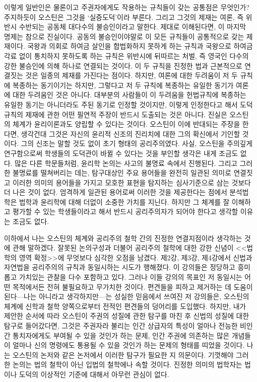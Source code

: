 이렇게 일반인은 물론이고 주권자에게도 작용하는 규칙들이 갖는
공통점은 무엇인가?
주지하듯이 오스틴은 그것을 `실증도덕'이라 부른다.
그리고 그것의 제재는 여론, 즉 위반시 수반되는 공동체 대다수의 불승인이라고
말한다.
제대로 이해된다면,
이 마지막 명제는 참으로 진실이다.
공동의 불승인이야말로 이 모든 규칙들이 공통적으로 갖는 제재이다.
국왕과 의회로 하여금 살인을 합법화하지 못하게 하는 규칙과
국왕으로 하여금 각료 없이 통치하지 못하도록 하는 규칙은
위반시에 뒤따르는 처벌, 즉 영국인 다수의 강한 불승인에 의해
하나로 연결되는 것이다.
이 두 규칙을 진정한 법과 근본적으로 연결짓는 것은
일종의 제재를 가진다는 점이다.
하지만,
여론에 대한 두려움이 저 두 규칙에 복종하는 동기이기는 하지만,
그렇다고 저 두 규칙에 복종하는 유일한 동기가 여론에 대한 두려움인 것은 아니다.
대부분의 사람들이
이 두려움을
헌법규칙에 복종하는
유일한 동기는 아니더라도 주된 동기로 인정할 것이지만,
이렇게 인정한다고 해서 도덕규칙의 제재에 관한
어떤 필연적 주장이 반드시 도출되는 것은 아니다.
진실은 오스틴의 체계가  윤리이론과도 양립할 수 있다는 것이다.
오스틴이 이에 반대되는 주장을 한다면,
생각건대 그것은 자신의 윤리적 신조의 진리치에 대한 그의 확신에서
기인할 것이다.
그의 신조는 말할 것도 없이 초기 형태의 공리주의였다.
사실,
오스틴을 주의깊게 연구함으로써 학생들의 도덕관이 바뀔 수 있다는 것을
부인할 생각은 내게 조금도 없다.
많은 다른 학문들처럼, 윤리학 논의는
사고의 불명료 속에서 진행된다.
그리고 그러한 불명료를 떨쳐버리는 데는,
탐구대상인 주요 용어들을 완전히 일관된 의미로 연결짓고
이러한 의미의 용어들을 가지고 모호한 표현을 탐지하는 심사기준으로
삼는 것보다 더 나은 것이 없다.
엄격하게 일관된 용어로써 이러한 것을 제공한다는 점에서
분석법학은 법학과 윤리학에 대해 더없이 소중한 가치를 지닌다.
하지만 그 체계를 잘 이해하고 평가할 수 있는 학생들이라고 해서
반드시 공리주의자가 되어야 한다고 생각할 이유는 조금도 없다.

이하에서 나는 오스틴의 체계와 공리주의 철학 간의 진정한 연결지점이라
생각하는 것에 관해 말하겠다.
잘못된 논의구성과 더불어 공리주의 철학에 대한 강한 신념이
<<법학의 영역 확정>>에 무엇보다 심각한 오점을 남겼다.
제2강, 제3강, 제4강에서
신법과 자연법을
공리주의의 규칙과 동일시하는 시도가 행해졌다.
이 강의들은 정당하고 흥미롭고 가치있는 관찰을 다수 포함하고 있다.
그러나 이들 강의의 목표인 저 동일시는
어떤 목적에서든
전혀 불필요하고 무가치한 것이다.
편견들을 피하고 제거하는 데 도움이 된다---나는 아니라고 생각하지만---는
성실한 믿음에서 쓰여진
저 강의들은,
오스틴의 체계에 신학과 철학 양쪽으로부터
전적인 편견들의 덩어리를 도입했다.
하지만,
내가 제안한 순서에 따라
오스틴이 주권의 성질에 관한 탐구를 마친 후
신법의 성질에 대한 탐구로 들어갔다면,
그것은
주권자라 불리는 인간 상급자의 특성이 얼마나
전능한 비인간 통치자에게도 부여될 수 있을 것인가 하는 문제,
인간 주권에 의존하는 많은 개념들이 얼마나
신의 명령에도 통용될 수 있을 것인가 하는 문제의 형태를 띠었을 것이다.
나는 오스틴의 논저와 같은 논저에서 이러한 탐구가 필요한 지 의문이다.
기껏해야
그러한 논의는
법의 철학이 아닌 입법의 철학에나
속할 것이다.
진정한 의미의 법학자는 법이나 도덕의 이상적인 기준에 대해서
아무런 관심이 없다.

